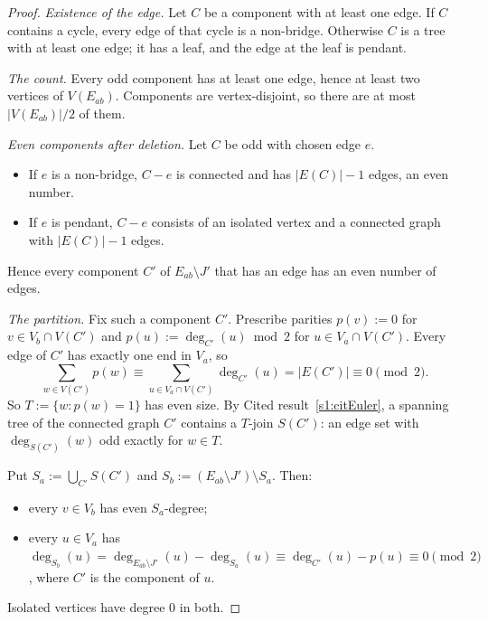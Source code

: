 \begin{proof}
\emph{Existence of the edge.} Let $C$ be a component with at least one edge. If $C$ contains a cycle, every edge of that cycle is a non-bridge. Otherwise $C$ is a tree with at least one edge; it has a leaf, and the edge at the leaf is pendant.

\emph{The count.} Every odd component has at least one edge, hence at least two vertices of $V(E_{ab})$. Components are vertex-disjoint, so there are at most $|V(E_{ab})|/2$ of them.

\emph{Even components after deletion.} Let $C$ be odd with chosen edge $e$.
\begin{itemize}
\item If $e$ is a non-bridge, $C-e$ is connected and has $|E(C)|-1$ edges, an even number.
\item If $e$ is pendant, $C-e$ consists of an isolated vertex and a connected graph with $|E(C)|-1$ edges.
\end{itemize}
Hence every component $C'$ of $E_{ab}\setminus J'$ that has an edge has an even number of edges.

\emph{The partition.} Fix such a component $C'$. Prescribe parities $p(v):=0$ for $v\in V_b\cap V(C')$ and $p(u):=\deg_{C'}(u)\bmod2$ for $u\in V_a\cap V(C')$. Every edge of $C'$ has exactly one end in $V_a$, so
\[
\sum_{w\in V(C')}p(w)\equiv\sum_{u\in V_a\cap V(C')}\deg_{C'}(u)=|E(C')|\equiv0\pmod2.
\]
So $T:=\{w:p(w)=1\}$ has even size. By Cited result~\ref{s1:citEuler}, a spanning tree of the connected graph $C'$ contains a $T$-join $S(C')$: an edge set with $\deg_{S(C')}(w)$ odd exactly for $w\in T$.

Put $S_a:=\bigcup_{C'}S(C')$ and $S_b:=(E_{ab}\setminus J')\setminus S_a$. Then:
\begin{itemize}
\item every $v\in V_b$ has even $S_a$-degree;
\item every $u\in V_a$ has $\deg_{S_b}(u)=\deg_{E_{ab}\setminus J'}(u)-\deg_{S_a}(u)\equiv\deg_{C'}(u)-p(u)\equiv0\pmod 2$, where $C'$ is the component of $u$.
\end{itemize}
Isolated vertices have degree $0$ in both.
\end{proof}

